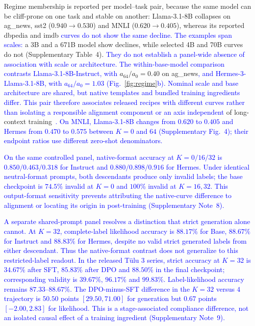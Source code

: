 \documentclass[pdflatex, sn-nature]{sn-jnl}%
\theoremstyle{thmstyleone}%
\theoremstyle{thmstyletwo}%
\theoremstyle{thmstylethree}%
\begin{document}
Regime membership is reported per model--task pair, because the same model can be
cliff-prone on one task and stable on another: Llama-3.1-8B collapses on ag\_news, sst2
($0.940\rightarrow0.530$) and MNLI ($0.620\rightarrow0.405$), whereas its reported dbpedia
and imdb \textcolor{blue}{curves do not show the same decline. The examples span scales:} a 3B and a 671B
model show declines, while selected 4B and 70B curves do not (Supplementary Table~4).
\textcolor{blue}{They do not establish a panel-wide absence of association with scale or architecture.
The within-base-model comparison contrasts Llama-3.1-8B-Instruct, with}
$a_{64}/a_{0}{=}0.40$ on ag\_news\textcolor{blue}{, and Hermes-3-Llama-3.1-8B, with $a_{64}/a_{0}{=}1.03$
(Fig.}~\textcolor{blue}{\ref{fig:regime}}\textcolor{blue}{b). Nominal scale and base architecture are shared, but native
templates and bundled training ingredients differ. This pair therefore associates
released recipes with different curves rather than isolating a responsible alignment
component or an axis independent} of long-context training~\cite{zou2025manyiclbench}\textcolor{blue}{.
On MNLI, Llama-3.1-8B changes from $0.620$ to $0.405$ and Hermes from $0.470$ to $0.575$ between $K{=}0$ and $64$ (Supplementary Fig.}~\textcolor{blue}{4); their endpoint ratios use different zero-shot denominators.}

\textcolor{blue}{On the same controlled panel, native-format accuracy at $K{=}0/16/32$ is $0.850/0.463/0.318$ for Instruct and $0.880/0.898/0.916$ for Hermes. Under identical neutral-format prompts, both descendants produce only invalid labels; the base checkpoint is $74.5\%$ invalid at $K{=}0$ and $100\%$ invalid at $K{=}16,32$. This output-format sensitivity prevents attributing the native-curve difference to alignment or locating its origin in post-training (Supplementary Note}~\textcolor{blue}{8).}

\textcolor{blue}{A separate shared-prompt panel resolves a distinction that strict generation alone cannot. At $K{=}32$, complete-label likelihood accuracy is $88.17\%$ for Base, $88.67\%$ for Instruct and $88.83\%$ for Hermes, despite no valid strict generated labels from either descendant. Thus the native-format contrast does not generalize to this restricted-label readout. In the released T\"ulu 3 series, strict accuracy at $K{=}32$ is $34.67\%$ after SFT, $85.83\%$ after DPO and $88.50\%$ in the final checkpoint; corresponding validity is $39.67\%$, $96.17\%$ and $99.83\%$. Label-likelihood accuracy remains $87.33$--$88.67\%$. The DPO-minus-SFT difference in the $K{=}32$ versus $4$ trajectory is $50.50$ points $[29.50,71.00]$ for generation but $0.67$ points $[-2.00,2.83]$ for likelihood. This is a stage-associated compliance difference, not an isolated causal effect of a training ingredient (Supplementary Note~9).}
\end{document}
